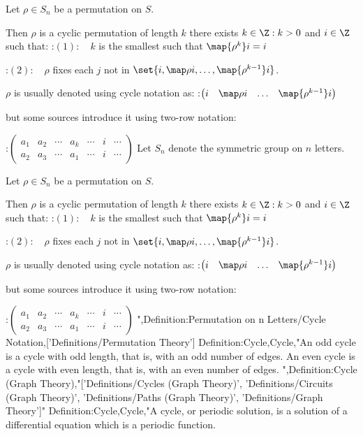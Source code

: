Let $\rho \in S_n$ be a permutation on $S$.


Then $\rho$ is a cyclic permutation of length $k$  there exists $k \in \Z: k > 0$ and $i \in \Z$ such that:
:$(1): \quad k$ is the smallest such that $\map {\rho^k} i = i$

:$(2): \quad \rho$ fixes each $j$ not in $\set {i, \map \rho i, \ldots, \map {\rho^{k - 1} } i}$.


$\rho$ is usually denoted using cycle notation as:
:$\begin{pmatrix} i & \map \rho i & \ldots & \map {\rho^{k - 1} } i \end{pmatrix}$

but some sources introduce it using two-row notation:

:$\begin{pmatrix} a_1 & a_2 & \cdots & a_k & \cdots & i & \cdots \\ a_2 & a_3 & \cdots & a_1 & \cdots & i & \cdots \end{pmatrix}$
Let $S_n$ denote the symmetric group on $n$ letters.

Let $\rho \in S_n$ be a permutation on $S$.


Then $\rho$ is a cyclic permutation of length $k$  there exists $k \in \Z: k > 0$ and $i \in \Z$ such that:
:$(1): \quad k$ is the smallest such that $\map {\rho^k} i = i$

:$(2): \quad \rho$ fixes each $j$ not in $\set {i, \map \rho i, \ldots, \map {\rho^{k - 1} } i}$.


$\rho$ is usually denoted using cycle notation as:
:$\begin{pmatrix} i & \map \rho i & \ldots & \map {\rho^{k - 1} } i \end{pmatrix}$

but some sources introduce it using two-row notation:

:$\begin{pmatrix} a_1 & a_2 & \cdots & a_k & \cdots & i & \cdots \\ a_2 & a_3 & \cdots & a_1 & \cdots & i & \cdots \end{pmatrix}$
",Definition:Permutation on n Letters/Cycle Notation,['Definitions/Permutation Theory']
Definition:Cycle,Cycle,"An odd cycle is a cycle with odd length, that is, with an odd number of edges.
An even cycle is a cycle with even length, that is, with an even number of edges.
",Definition:Cycle (Graph Theory),"['Definitions/Cycles (Graph Theory)', 'Definitions/Circuits (Graph Theory)', 'Definitions/Paths (Graph Theory)', 'Definitions/Graph Theory']"
Definition:Cycle,Cycle,"A cycle, or periodic solution, is a solution of a differential equation which is a periodic function.

